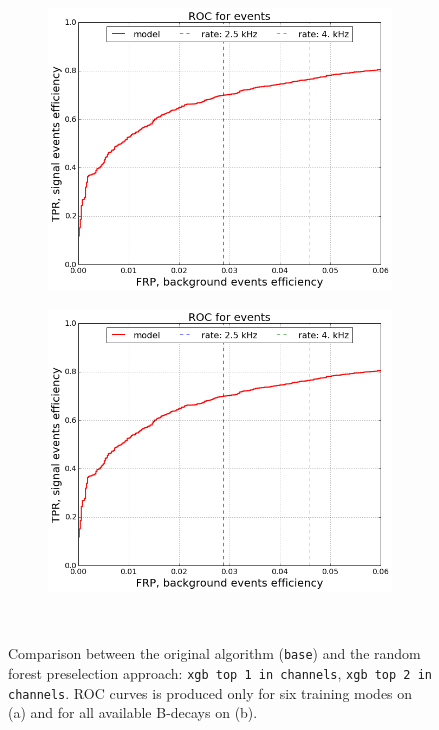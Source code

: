 \documentclass{llncs}
\begin{document}
\begin{figure}
	\begin{center}
    	\begin{subfigure}[b]{0.45\textwidth}
    		\includegraphics[width=\textwidth]{../../img/roc_events.png} \caption{}
    	\end{subfigure} %
    	\begin{subfigure}[b]{0.45\textwidth}
    		\includegraphics[width=\textwidth]{../../img/roc_events.png} \caption{} %
    	\end{subfigure}
    \end{center}
  \caption{Comparison between the original algorithm (\texttt{base}) and the random forest preselection approach: \texttt{xgb top 1 in channels}, \texttt{xgb top 2 in channels}. ROC curves is produced only for six training modes on (a) and for all available B-decays on (b).}~\label{fig:xgb_channel}
\end{figure}
\end{document}
